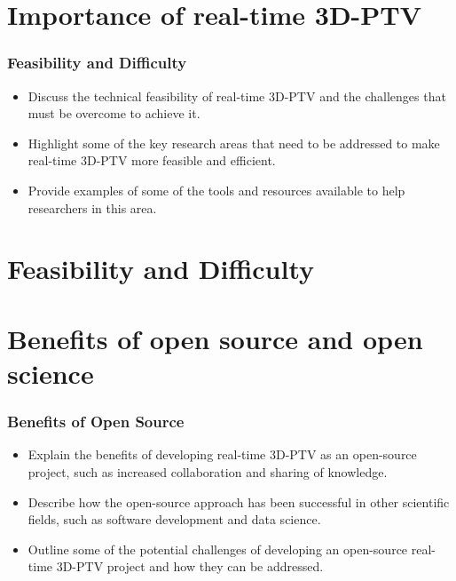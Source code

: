 \documentclass[aspectratio=43]{beamer}
\begin{document}
\section{Importance of real-time 3D-PTV}


\begin{frame}
\frametitle{Feasibility and Difficulty}
\begin{itemize}
\item Discuss the technical feasibility of real-time 3D-PTV and the challenges that must be overcome to achieve it.
\item Highlight some of the key research areas that need to be addressed to make real-time 3D-PTV more feasible and efficient.
\item Provide examples of some of the tools and resources available to help researchers in this area.
\end{itemize}
\end{frame}


\section{Feasibility and Difficulty}




\section{Benefits of open source and open science}

\begin{frame}
\frametitle{Benefits of Open Source}
\begin{itemize}
\item Explain the benefits of developing real-time 3D-PTV as an open-source project, such as increased collaboration and sharing of knowledge.
\item Describe how the open-source approach has been successful in other scientific fields, such as software development and data science.
\item Outline some of the potential challenges of developing an open-source real-time 3D-PTV project and how they can be addressed.
\end{itemize}
\end{frame}
\end{document}

